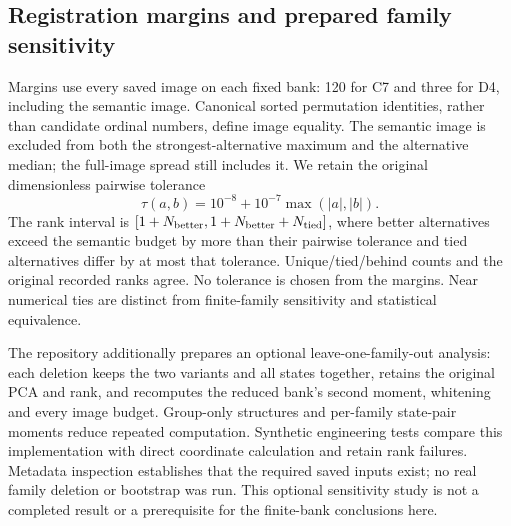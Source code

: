 \FloatBarrier
\subsection{Registration margins and prepared family sensitivity}
\label{app:bounded-margin-details}
Margins use every saved image on each fixed bank: 120 for C7 and three for D4, including the semantic image. Canonical sorted permutation identities, rather than candidate ordinal numbers, define image equality. The semantic image is excluded from both the strongest-alternative maximum and the alternative median; the full-image spread still includes it. We retain the original dimensionless pairwise tolerance
\[
 \tau(a,b)=10^{-8}+10^{-7}\max(|a|,|b|).
\]
The rank interval is $[1+N_{\rm better},1+N_{\rm better}+N_{\rm tied}]$, where better alternatives exceed the semantic budget by more than their pairwise tolerance and tied alternatives differ by at most that tolerance. Unique/tied/behind counts and the original recorded ranks agree. No tolerance is chosen from the margins. Near numerical ties are distinct from finite-family sensitivity and statistical equivalence.

The repository additionally prepares an optional leave-one-family-out analysis: each deletion keeps the two variants and all states together, retains the original PCA and rank, and recomputes the reduced bank's second moment, whitening and every image budget. Group-only structures and per-family state-pair moments reduce repeated computation. Synthetic engineering tests compare this implementation with direct coordinate calculation and retain rank failures. Metadata inspection establishes that the required saved inputs exist; no real family deletion or bootstrap was run. This optional sensitivity study is not a completed result or a prerequisite for the finite-bank conclusions here.

\begin{table}[p]
\centering\small

\caption{C7 complete spectral margins, spread and original-tolerance rank intervals. U/T/B denotes unique leading/tied leading/behind. Full-precision CSV values and canonical image hashes are retained.}
\label{tab:bounded-cell-margins-c7}
\end{table}
\begin{table}[p]
\centering\small

\caption{D4 complete spectral margins, spread and original-tolerance rank intervals. These registered tasks have different target correspondences and do not provide exact-action risk rankings.}
\label{tab:bounded-cell-margins-d4}
\end{table}
\FloatBarrier
